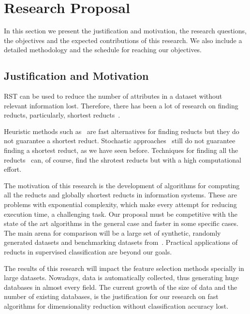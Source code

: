 \documentclass[authoryear,11pt]{elsarticle}
\begin{document}
\section{Research Proposal}\label{ResearchProposal} 
 In this section we present the justification and motivation, the research questions, the objectives and the
 expected contributions of this research. We also include a detailed methodology and the schedule for reaching
 our objectives.

\subsection{Justification and Motivation}\label{Justification}
  RST can be used to reduce the number of attributes in a dataset without relevant information lost. 
  Therefore, there has been a lot of research on finding reducts, particularly, shortest 
  reducts~\citep{Jensen14}. %
  
  Heuristic methods such as~\citep{Chouchoulas01,Jensen04,Zhong01} are fast alternatives for finding 
  reducts but they do not guarantee a shortest reduct. Stochastic approaches~\citep{Wroblewski95,Jensen03,
  Chen10,Wang07} still do not guarantee finding a shortest reduct, as we have seen before. Techniques 
  for finding all the reducts~\citep{Starzyk99,WangP07} can, of course, find the
  shrotest reducts but with a high computational effort.
  
  The motivation of this research is the development of algorithms for computing all the reducts and 
  globally shortest reducts in information systems. These are problems with exponential complexity, which 
  make every attempt for reducing execution time, a challenging task.
  Our proposal must be competitive with the state of 
  the art algorithms in the general case and faster in some specific cases. The main arena for comparison 
  will be a large set of synthetic, randomly generated datasets and benchmarking datasets from~\citep{Bache13}. 
  Practical applications of reducts in supervised classification are beyond our goals.
  
  The results of this research will impact the feature selection methods specially in large datasets.
  Nowadays, data is automatically collected, thus generating huge databases in almost every field. The 
  current growth of the size of data and the number of existing databases, is the justification for our
  research on fast algorithms for dimensionality reduction without classification accuracy lost.  
  
\end{document}
